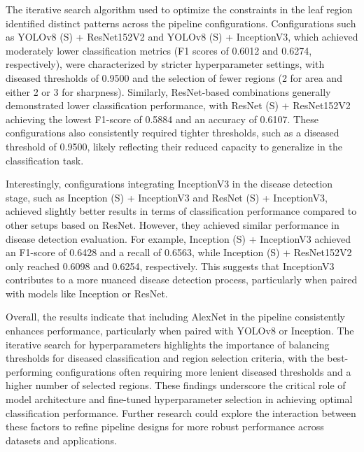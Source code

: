 \documentclass[draft,final]{vutinfth} %
\begin{document}
The iterative search algorithm used to optimize the constraints in the leaf region identified distinct patterns across the pipeline configurations. Configurations such as YOLOv8 (S) + ResNet152V2 and YOLOv8 (S) + InceptionV3, which achieved moderately lower classification metrics (F1 scores of 0.6012 and 0.6274, respectively), were characterized by stricter hyperparameter settings, with diseased thresholds of 0.9500 and the selection of fewer regions (2 for area and either 2 or 3 for sharpness). Similarly, ResNet-based combinations generally demonstrated lower classification performance, with ResNet (S) + ResNet152V2 achieving the lowest F1-score of 0.5884 and an accuracy of 0.6107. These configurations also consistently required tighter thresholds, such as a diseased threshold of 0.9500, likely reflecting their reduced capacity to generalize in the classification task.

Interestingly, configurations integrating InceptionV3 in the disease detection stage, such as Inception (S) + InceptionV3 and ResNet (S) + InceptionV3, achieved slightly better results in terms of classification performance compared to other setups based on ResNet. However, they achieved similar performance in disease detection evaluation. For example, Inception (S) + InceptionV3 achieved an F1-score of 0.6428 and a recall of 0.6563, while Inception (S) + ResNet152V2 only reached 0.6098 and 0.6254, respectively. This suggests that InceptionV3 contributes to a more nuanced disease detection process, particularly when paired with models like Inception or ResNet.

Overall, the results indicate that including AlexNet in the pipeline consistently enhances performance, particularly when paired with YOLOv8 or Inception. The iterative search for hyperparameters highlights the importance of balancing thresholds for diseased classification and region selection criteria, with the best-performing configurations often requiring more lenient diseased thresholds and a higher number of selected regions. These findings underscore the critical role of model architecture and fine-tuned hyperparameter selection in achieving optimal classification performance. Further research could explore the interaction between these factors to refine pipeline designs for more robust performance across datasets and applications.
\end{document}
